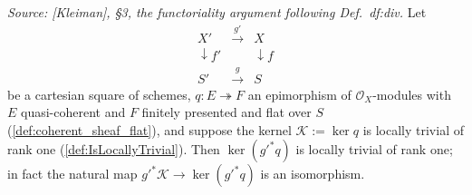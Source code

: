 \begin{lemma}
  \label{lem:relative_divisor_base_change}
  \textit{Source: [Kleiman], \S 3, the functoriality argument following
  Def.~df:div.}
  Let
  \[
    \begin{array}{ccc}
      X' & \xrightarrow{\ g'\ } & X \\
      \downarrow f' & & \downarrow f \\
      S' & \xrightarrow{\ g\ } & S
    \end{array}
  \]
  be a cartesian square of schemes, \(q : E \twoheadrightarrow F\) an
  epimorphism of \(\mathcal O_X\)-modules with \(E\) quasi-coherent and
  \(F\) finitely presented and flat over \(S\)
  (\cref{def:coherent_sheaf_flat}), and suppose the kernel
  \(\mathcal K := \ker q\) is locally trivial of rank one
  (\cref{def:IsLocallyTrivial}).  Then \(\ker (g'^* q)\) is locally trivial
  of rank one; in fact the natural map \(g'^* \mathcal K \to \ker(g'^* q)\)
  is an isomorphism.
\end{lemma}
